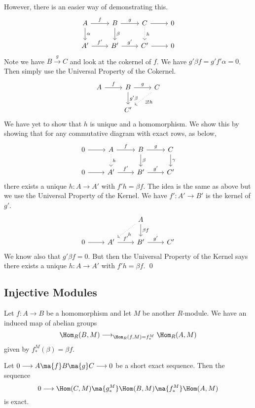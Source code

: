 However, there is an easier way of demonstrating this. 
\[
\begin{tikzcd}
A \arrow{r}{f} \arrow{d}{\alpha} & B \arrow{r}{g} \arrow{d}{\beta} & C \arrow{r} \arrow[dotted]{d}{h} & 0 \\
A' \arrow{r}{f'} & B' \arrow{r}{g'} & C' \arrow{r} & 0
\end{tikzcd}
\]
Note we have $B \stackrel{g}{\longrightarrow} C$ and look at the cokernel of $f$. We have $g'\beta f=g'f'\alpha=0$. Then simply use the Universal Property of the Cokernel. 
\[
\begin{tikzcd}
A \arrow{r}{f} & B \arrow{d}{g'\beta} \arrow{r}{g} & C \arrow[dotted]{dl}{\exists!h} \\
& C' & 
\end{tikzcd}
\]
We have yet to show that $h$ is unique and a homomorphism. We show this by showing that for any commutative diagram with exact rows, as below,
\[
\begin{tikzcd}
0 \arrow{r} & A \arrow{r}{f} \arrow[dotted]{d}{h} & B \arrow{r}{g} \arrow{d}{\beta} & C \arrow{d}{\gamma} \\
0 \arrow{r} & A' \arrow{r}{f'} & B' \arrow{r}{g'}  & C'
\end{tikzcd}
\]
there exists a unique $h: A \rightarrow A'$ with $f'h=\beta f$. The idea is the same as above but we use the Universal Property of the Kernel. We have $f': A' \rightarrow B'$ is the kernel of $g'$.
\[
\begin{tikzcd}
\; & \; & A \arrow[dotted]{dl}{h} \arrow{d}{\beta f} & \\
0 \arrow{r} & A' \arrow{r}{f'} & B' \arrow{r}{g'} & C'
\end{tikzcd}
\]
We know also that $g'\beta f=0$. But then the Universal Property of the Kernel says there exists a unique $h: A \rightarrow A'$ with $f'h=\beta f$. \qed \\


\subsection{Injective Modules}


Let $f: A \rightarrow B$ be a homomorphism and let $M$ be another $R$-module. We have an induced map of abelian groups
\[
\Hom_R(B,M) \longrightarrow_{\Hom_R(f,M)=f_*^M} \Hom_R(A,M)
\]
given by $f_*^M(\beta)=\beta f$. 

\begin{prop}
Let $0 \longrightarrow A \ma{f} B \ma{g} C \longrightarrow 0$ be a short exact sequence. Then the sequence
\[
0 \longrightarrow \Hom(C,M) \ma{g_*^M} \Hom(B,M) \ma{f_*^M} \Hom(A,M)
\]
is exact.
\end{prop}

